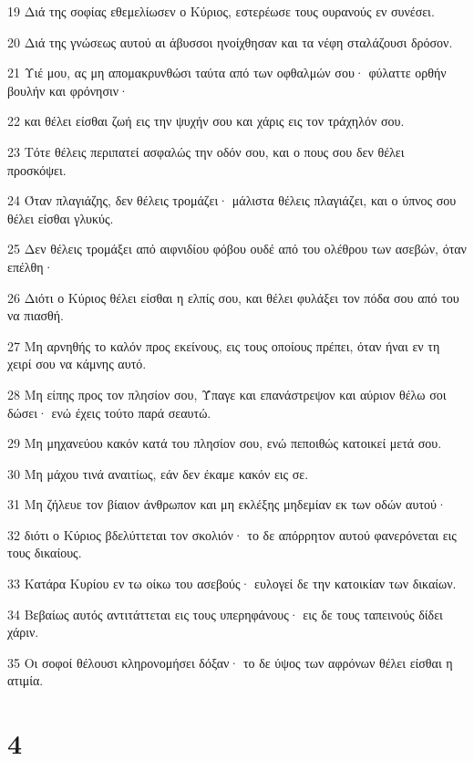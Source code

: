 \par 19 Διά της σοφίας εθεμελίωσεν ο Κύριος, εστερέωσε τους ουρανούς εν συνέσει.
\par 20 Διά της γνώσεως αυτού αι άβυσσοι ηνοίχθησαν και τα νέφη σταλάζουσι δρόσον.
\par 21 Υιέ μου, ας μη απομακρυνθώσι ταύτα από των οφθαλμών σου· φύλαττε ορθήν βουλήν και φρόνησιν·
\par 22 και θέλει είσθαι ζωή εις την ψυχήν σου και χάρις εις τον τράχηλόν σου.
\par 23 Τότε θέλεις περιπατεί ασφαλώς την οδόν σου, και ο πους σου δεν θέλει προσκόψει.
\par 24 Όταν πλαγιάζης, δεν θέλεις τρομάζει· μάλιστα θέλεις πλαγιάζει, και ο ύπνος σου θέλει είσθαι γλυκύς.
\par 25 Δεν θέλεις τρομάξει από αιφνιδίου φόβου ουδέ από του ολέθρου των ασεβών, όταν επέλθη·
\par 26 Διότι ο Κύριος θέλει είσθαι η ελπίς σου, και θέλει φυλάξει τον πόδα σου από του να πιασθή.
\par 27 Μη αρνηθής το καλόν προς εκείνους, εις τους οποίους πρέπει, όταν ήναι εν τη χειρί σου να κάμνης αυτό.
\par 28 Μη είπης προς τον πλησίον σου, Ύπαγε και επανάστρεψον και αύριον θέλω σοι δώσει· ενώ έχεις τούτο παρά σεαυτώ.
\par 29 Μη μηχανεύου κακόν κατά του πλησίον σου, ενώ πεποιθώς κατοικεί μετά σου.
\par 30 Μη μάχου τινά αναιτίως, εάν δεν έκαμε κακόν εις σε.
\par 31 Μη ζήλευε τον βίαιον άνθρωπον και μη εκλέξης μηδεμίαν εκ των οδών αυτού·
\par 32 διότι ο Κύριος βδελύττεται τον σκολιόν· το δε απόρρητον αυτού φανερόνεται εις τους δικαίους.
\par 33 Κατάρα Κυρίου εν τω οίκω του ασεβούς· ευλογεί δε την κατοικίαν των δικαίων.
\par 34 Βεβαίως αυτός αντιτάττεται εις τους υπερηφάνους· εις δε τους ταπεινούς δίδει χάριν.
\par 35 Οι σοφοί θέλουσι κληρονομήσει δόξαν· το δε ύψος των αφρόνων θέλει είσθαι η ατιμία.

\chapter{4}

